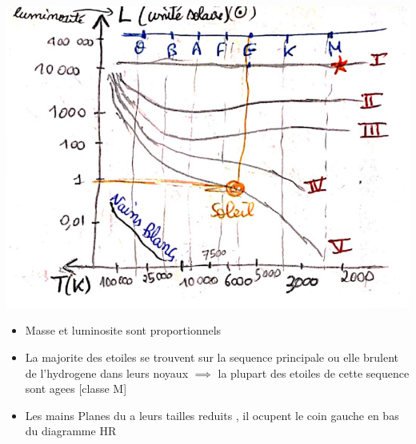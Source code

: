 \documentclass[12pt]{book}
\begin{document}
\begin{itemize}
\begin{center}
\begin{minipage}{0.5\linewidth}
                        \includegraphics[width =\linewidth]{pic/herzprungdiagram.png}
                    \end{minipage}
                \end{center}
                \begin{itemize}
                    \item Masse et luminosite sont proportionnels 
                    \item La majorite des etoiles se trouvent sur la sequence principale ou elle brulent de l'hydrogene dans leurs noyaux $ \implies$ la plupart des etoiles de cette sequence sont agees [classe M]
                    \item Les mains Planes du a leurs tailles reduits , il ocupent le coin gauche en bas du diagramme HR 
                \end{itemize}
        \end{itemize}
\end{document}
